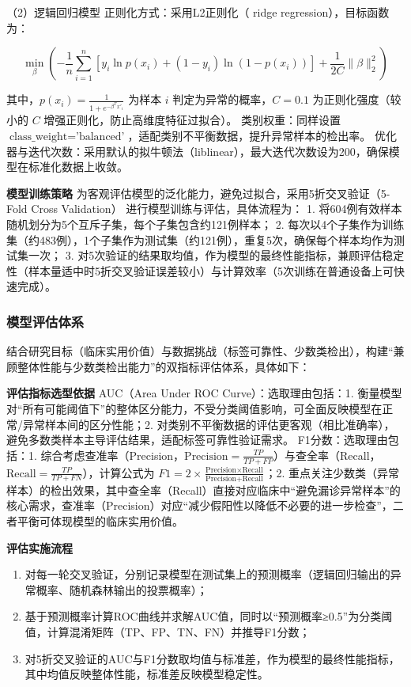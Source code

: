 \documentclass[withoutpreface,bwprint]{cumcmthesis} %
\begin{document}
（2）逻辑回归模型
正则化方式：采用L2正则化（ ridge regression），目标函数为：  

  $$
  \min_{\beta} \left( -\frac{1}{n} \sum_{i=1}^n [y_i \ln p(x_i) + (1-y_i) \ln (1-p(x_i))] + \frac{1}{2C} \|\beta\|_2^2 \right)
  $$  

  其中，$ p(x_i) = \frac{1}{1+e^{-\beta^T x'_i}} $ 为样本 $ i $ 判定为异常的概率，$ C = 0.1 $ 为正则化强度（较小的 $ C $ 增强正则化，防止高维度特征过拟合）。  
类别权重：同样设置 $ \text{class\_weight} = \text{'balanced'} $，适配类别不平衡数据，提升异常样本的检出率。  
优化器与迭代次数：采用默认的拟牛顿法（liblinear），最大迭代次数设为200，确保模型在标准化数据上收敛。

\textbf{模型训练策略}
为客观评估模型的泛化能力，避免过拟合，采用5折交叉验证（5-Fold Cross Validation） 进行模型训练与评估，具体流程为：  
1. 将604例有效样本随机划分为5个互斥子集，每个子集包含约121例样本；  
2. 每次以4个子集作为训练集（约483例），1个子集作为测试集（约121例），重复5次，确保每个样本均作为测试集一次；  
3. 对5次验证的结果取均值，作为模型的最终性能指标，兼顾评估稳定性（样本量适中时5折交叉验证误差较小）与计算效率（5次训练在普通设备上可快速完成）。


\subsubsection{模型评估体系}
结合研究目标（临床实用价值）与数据挑战（标签可靠性、少数类检出），构建“兼顾整体性能与少数类检出能力”的双指标评估体系，具体如下：

\textbf{评估指标选型依据}
AUC（Area Under ROC Curve）：选取理由包括：1. 衡量模型对“所有可能阈值下”的整体区分能力，不受分类阈值影响，可全面反映模型在正常/异常样本间的区分性能；2. 对类别不平衡数据的评估更客观（相比准确率），避免多数类样本主导评估结果，适配标签可靠性验证需求。  
F1分数：选取理由包括：1. 综合考虑查准率（Precision，$ \text{Precision} = \frac{TP}{TP+FP} $）与查全率（Recall，$ \text{Recall} = \frac{TP}{TP+FN} $），计算公式为 $ F1 = 2 \times \frac{\text{Precision} \times \text{Recall}}{\text{Precision} + \text{Recall}} $；2. 重点关注少数类（异常样本）的检出效果，其中查全率（Recall）直接对应临床中“避免漏诊异常样本”的核心需求，查准率（Precision）对应“减少假阳性以降低不必要的进一步检查”，二者平衡可体现模型的临床实用价值。

\textbf{评估实施流程}
\begin{enumerate}
    \item 对每一轮交叉验证，分别记录模型在测试集上的预测概率（逻辑回归输出的异常概率、随机森林输出的投票概率）；
    \item 基于预测概率计算ROC曲线并求解AUC值，同时以“预测概率≥0.5”为分类阈值，计算混淆矩阵（TP、FP、TN、FN）并推导F1分数； 
    \item 对5折交叉验证的AUC与F1分数取均值与标准差，作为模型的最终性能指标，其中均值反映整体性能，标准差反映模型稳定性。
\end{enumerate}
\end{document}
